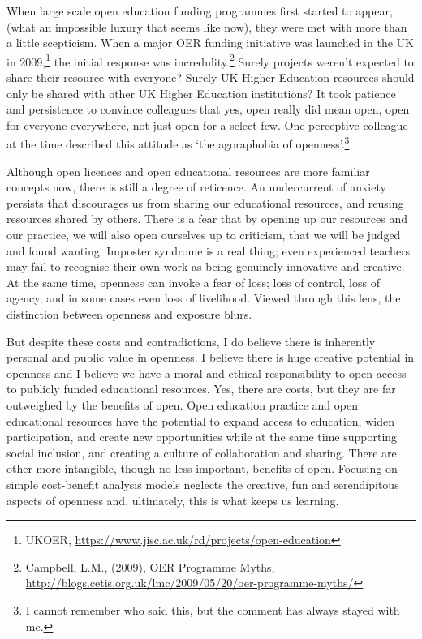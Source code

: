 When large scale open education funding programmes first started to
appear, (what an impossible luxury that seems like now), they were met
with more than a little scepticism. When a major OER funding initiative
was launched in the UK in 2009,\footnote{UKOER,
  \url{https://www.jisc.ac.uk/rd/projects/open-education}} the initial
response was incredulity.\footnote{Campbell, L.M., (2009), OER Programme
  Myths,
  \url{http://blogs.cetis.org.uk/lmc/2009/05/20/oer-programme-myths/}}
Surely projects weren't expected to share their resource with everyone?
Surely UK Higher Education resources should only be shared with other UK
Higher Education institutions? It took patience and persistence to
convince colleagues that yes, open really did mean open, open for
everyone everywhere, not just open for a select few. One perceptive
colleague at the time described this attitude as `the agoraphobia of
openness'.\footnote{I cannot remember who said this, but the comment has
  always stayed with me.}

Although open licences and open educational resources are more familiar
concepts now, there is still a degree of reticence. An undercurrent of
anxiety persists that discourages us from sharing our educational
resources, and reusing resources shared by others. There is a fear that
by opening up our resources and our practice, we will also open
ourselves up to criticism, that we will be judged and found wanting.
Imposter syndrome is a real thing; even experienced teachers may fail to
recognise their own work as being genuinely innovative and creative. At
the same time, openness can invoke a fear of loss; loss of control, loss
of agency, and in some cases even loss of livelihood. Viewed through
this lens, the distinction between openness and exposure blurs.

But despite these costs and contradictions, I do believe there is
inherently personal and public value in openness. I believe there is
huge creative potential in openness and I believe we have a moral and
ethical responsibility to open access to publicly funded educational
resources. Yes, there are costs, but they are far outweighed by the
benefits of open. Open education practice and open educational resources
have the potential to expand access to education, widen participation,
and create new opportunities while at the same time supporting social
inclusion, and creating a culture of collaboration and sharing. There
are other more intangible, though no less important, benefits of open.
Focusing on simple cost-benefit analysis models neglects the creative,
fun and serendipitous aspects of openness and, ultimately, this is what
keeps us learning.

